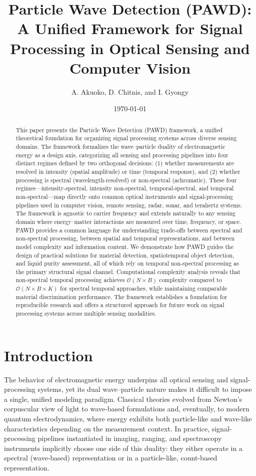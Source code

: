 \documentclass[11pt]{article}
\title{Particle Wave Detection (PAWD): A Unified Framework for Signal Processing in Optical Sensing and Computer Vision}
\author{A. Akuoko, D. Chitnis, and I. Gyongy}
\date{\today}
\begin{document}
\maketitle

\begin{abstract}
This paper presents the Particle Wave Detection (PAWD) framework, a unified theoretical foundation for organizing signal processing systems across diverse sensing domains. The framework formalizes the wave--particle duality of electromagnetic energy as a design axis, categorizing all sensing and processing pipelines into four distinct regimes defined by two orthogonal decisions: (1) whether measurements are resolved in intensity (spatial amplitude) or time (temporal response), and (2) whether processing is spectral (wavelength-resolved) or non-spectral (achromatic). These four regimes---intensity-spectral, intensity non-spectral, temporal-spectral, and temporal non-spectral---map directly onto common optical instruments and signal-processing pipelines used in computer vision, remote sensing, radar, sonar, and terahertz systems. The framework is agnostic to carrier frequency and extends naturally to any sensing domain where energy--matter interactions are measured over time, frequency, or space. PAWD provides a common language for understanding trade-offs between spectral and non-spectral processing, between spatial and temporal representations, and between model complexity and information content. We demonstrate how PAWD guides the design of practical solutions for material detection, spatiotemporal object detection, and liquid purity assessment, all of which rely on temporal non-spectral processing as the primary structural signal channel. Computational complexity analysis reveals that non-spectral temporal processing achieves $\mathcal{O}(N \times B)$ complexity compared to $\mathcal{O}(N \times B \times K)$ for spectral temporal approaches, while maintaining comparable material discrimination performance. The framework establishes a foundation for reproducible research and offers a structured approach for future work on signal processing systems across multiple sensing modalities.
\end{abstract}

\section{Introduction}

The behavior of electromagnetic energy underpins all optical sensing and signal-processing systems, yet its dual wave--particle nature makes it difficult to impose a single, unified modeling paradigm. Classical theories evolved from Newton's corpuscular view of light to wave-based formulations and, eventually, to modern quantum electrodynamics, where energy exhibits both particle-like and wave-like characteristics depending on the measurement context. In practice, signal-processing pipelines instantiated in imaging, ranging, and spectroscopy instruments implicitly choose one side of this duality: they either operate in a spectral (wave-based) representation or in a particle-like, count-based representation.
\end{document}
